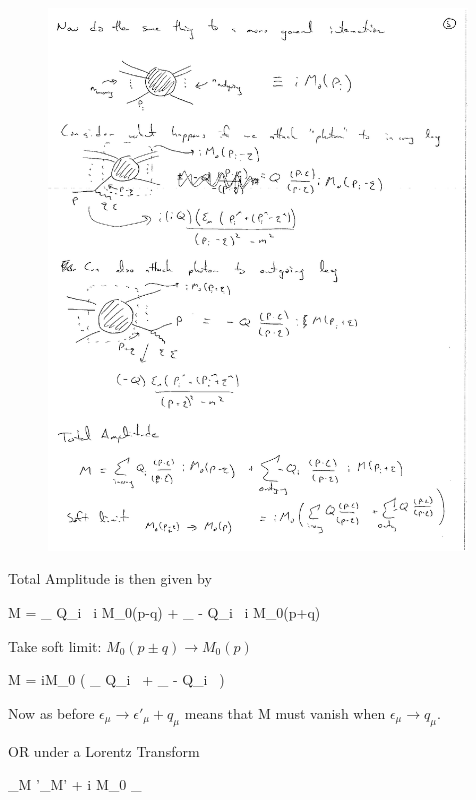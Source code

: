 {\begin{figure}[h]
\includegraphics[width=0.99\textwidth]{./outgoingPhoton.pdf}
\end{figure}

Total Amplitude is then given by

\be
M  = \sum_{} Q_i \ i M_0(p-q) + \sum_{} - Q_i \ i M_0(p+q)
\ee

Take soft limit: $M_0(p\pm q) \rightarrow M_0(p)$

\be
M  = iM_0 \left( \sum_{} Q_i \  + \sum_{} - Q_i \   \right)
\ee

Now as before $\epsilon_\mu \rightarrow \epsilon'_\mu + q_\mu$ means that M must vanish when $\epsilon_\mu \rightarrow q_\mu$.

OR under a Lorentz Transform

\be
\epsilon_\mu \cdot M \rightarrow \epsilon'_\mu \cdot M' + i M_0 _{}
\ee

}
